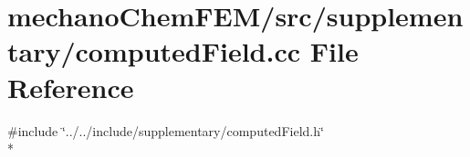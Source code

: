 \section{mechano\-Chem\-F\-E\-M/src/supplementary/computed\-Field.cc File Reference}
\label{computed_field_8cc}
{\ttfamily \#include \char`\"{}../../include/supplementary/computed\-Field.\-h\char`\"{}}\\*
